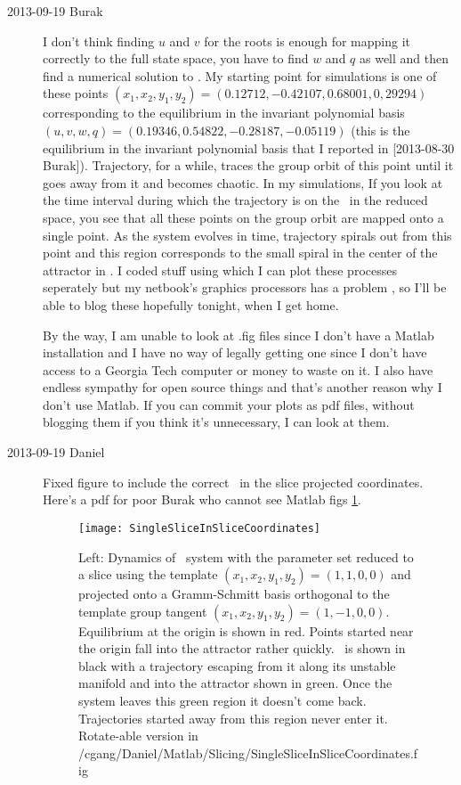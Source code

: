 \begin{description}
\item[2013-09-19 Burak] I don't think finding $u$ and $v$ for the roots is enough for mapping it
correctly to the full state space, you have to find $w$ and $q$ as well and then find a
numerical solution to . My starting point for simulations is one of these
points $(x_1, x_2, y_1, y_2) =  (0.12712, -0.42107, 0.68001, 0,29294)$ corresponding to the equilibrium 
in the invariant polynomial basis $(u,v,w,q) = (0.19346, 0.54822, −0.28187, −0.05119)$ (this is the
equilibrium in the invariant polynomial basis that I reported in [2013-08-30 Burak]). Trajectory, for a 
while, traces the group orbit of this point until it goes away from it and becomes chaotic. 
In my simulations, If you look at the time interval during which the trajectory is on the \reqv\, in the
reduced space, you see that all these points on the group orbit are mapped onto a single point.
As the system evolves in time, trajectory spirals out from this point and this region corresponds to the 
small spiral in the center of the attractor in . I coded stuff 
using which I can plot these processes seperately but my netbook's graphics processors has a problem , so
 I'll be able to blog these hopefully tonight, when I get home. 

By the way, I am unable to look at .fig files since I don't have a Matlab installation and I have no way
 of legally getting one since I don't have access to a Georgia Tech computer or money to waste on it. I 
 also have endless sympathy for open source things and that's another reason why I don't use Matlab. 
 If you can commit your plots as pdf files, without blogging them if you think it's unnecessary, I can 
 look at them.

\item[2013-09-19 Daniel] Fixed figure to include the correct \reqv\, in the slice projected coordinates.
Here's a pdf for poor Burak who cannot see Matlab figs \ref{fig:DBSingleSliceReducedDynamics}.

\begin{figure}%
  \begin{center}
  \texttt{[image: SingleSliceInSliceCoordinates]}
  \end{center}
  \caption{Left: Dynamics of \twoMode\ system with the parameter set
   reduced to a slice using the template
 	$(x_1, x_2, y_1, y_2) =  (1, 1, 0, 0)$ and projected onto a Gramm-Schmitt
 	basis orthogonal to the template group tangent $(x_1, x_2, y_1, y_2) =  
 	(1, -1, 0, 0)$. Equilibrium at the origin is shown in red. Points started near 
 	the origin fall into the attractor rather quickly. \reqv\, is
 	shown in black with a trajectory escaping from it along its unstable manifold
 	and into the attractor shown in green. Once the system leaves this green region
 	it doesn't come back. Trajectories started away from this region never enter it.
 	Rotate-able version in /cgang/Daniel/Matlab/Slicing/SingleSliceInSliceCoordinates.fig}
  \label{fig:DBSingleSliceReducedDynamics}
\end{figure}


\end{description}
